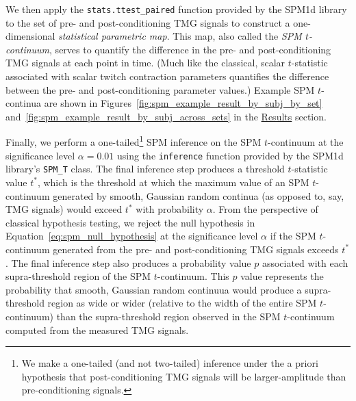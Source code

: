 \documentclass[utf8]{FrontiersinHarvard}
\begin{document}
We then apply the \texttt{stats.ttest\_paired} function provided by the SPM1d library to the set of pre- and post-conditioning TMG signals to construct a one-dimensional \textit{statistical parametric map}.
This map, also called the \textit{SPM $ t $-continuum}, serves to quantify the difference in the pre- and post-conditioning TMG signals at each point in time.
(Much like the classical, scalar $ t $-statistic associated with scalar twitch contraction parameters quantifies the difference between the pre- and post-conditioning parameter values.)
Example SPM $ t $-continua are shown in Figures~\ref{fig:spm_example_result_by_subj_by_set} and~\ref{fig:spm_example_result_by_subj_across_sets} in the \hyperref[s:results]{Results} section.

Finally, we perform a one-tailed\footnote{We make a one-tailed (and not two-tailed) inference under the a priori hypothesis that post-conditioning TMG signals will be larger-amplitude than pre-conditioning signals.} SPM inference on the SPM $ t $-continuum at the significance level $ \alpha = 0.01 $ using the \texttt{inference} function provided by the SPM1d library's \texttt{SPM\_T} class.
The final inference step produces a threshold $ t $-statistic value $ t^{*} $, which is the threshold at which the maximum value of an SPM $ t $-continuum generated by smooth, Gaussian random continua (as opposed to, say, TMG signals) would exceed $ t^{*} $ with probability $ \alpha $.
From the perspective of classical hypothesis testing, we reject the null hypothesis in Equation~\ref{eq:spm_null_hypothesis} at the significance level $ \alpha $ if the SPM $ t $-continuum generated from the pre- and post-conditioning TMG signals exceeds $ t^{*} $.
The final inference step also produces a probability value $ p $ associated with each supra-threshold region of the SPM $ t $-continuum.
This $ p $ value represents the probability that smooth, Gaussian random continuua would produce a supra-threshold region as wide or wider (relative to the width of the entire SPM $ t $-continuum) than the supra-threshold region observed in the SPM $ t $-continuum computed from the measured TMG signals.

\end{document}
